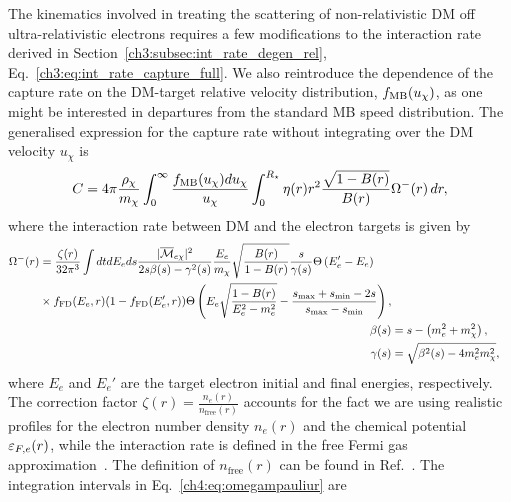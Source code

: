 The kinematics involved in treating the scattering of non-relativistic DM off ultra-relativistic electrons requires a few modifications to the interaction rate derived in Section~\ref{ch3:subsec:int_rate_degen_rel}, Eq.~\ref{ch3:eq:int_rate_capture_full}.
We also reintroduce the dependence of the capture rate on the DM-target relative velocity distribution, $f_{\rm MB}(u_\chi)$, as one might be interested in departures from the standard MB speed distribution. The generalised expression for the capture rate without integrating over the DM velocity $u_\chi$ is 
\begin{equation}
C = 4\pi \frac{\rho_\chi}{m_\chi} \int_0^\infty \frac{f_{\rm MB}(u_\chi)du_\chi}{u_\chi}
\int_0^{R_\star} \eta(r) r^2 \frac{\sqrt{1-B(r)}}{B(r)} \Omega^{-}(r)  \, dr,     \label{ch4:eq:capturelec}
\end{equation}
where the interaction rate between DM and the electron targets is given by~\cite{Bell:2020jou_sep_ImprovedTreatmentDark,Bell:2020lmm_mar_ImprovedTreatmentDark} 
\small
\begin{align}
    \begin{split}
        \Omega^{-}(r) &= \frac{\zeta(r)}{32\pi^3}\int dt dE_e ds  
        \frac{|\overline{\mathcal{M}}_{e\chi}|^2}{2s\beta(s)-\gamma^2(s)}  \frac{E_e}{m_\chi}\sqrt{\frac{B(r)}{1-B(r)}} \frac{s}{\gamma(s)}\Theta\left(E_e'-E_e\right)\\
        &\times f_{\rm FD}(E_e,r)(1-f_{\rm FD}(E_e',r))\Theta\left(E_e\sqrt{\frac{1-B(r)}{E_e^2-m_e^2}}-\frac{s_\mathrm{max}+s_\mathrm{min}-2s}{s_\mathrm{max}-s_\mathrm{min}}\right),
        \label{ch4:eq:omegampauliur}
    \end{split}\\
        \beta(s) &= s-\left(m_e^2+m_\chi^2\right),\\
        \gamma(s) &= \sqrt{\beta^2(s)-4m_e^2m_\chi^2},
\end{align}
\normalsize
where $E_e$ and $E_e'$ are the target electron initial and final energies, respectively. The correction factor $\zeta(r)=\frac{n_{e}(r)}{n_\mathrm{free}(r)}$ accounts for the fact we are using realistic profiles for the electron number density $n_e(r)$ and the chemical potential $\varepsilon_{F,e}(r)$, while the interaction rate is defined in the free Fermi gas approximation~\cite{Garani:2018kkd_may_NewAnalysisNeutron,Bell:2020jou_sep_ImprovedTreatmentDark,Bell:2020obw_sep_NucleonStructureStrong}. 
The definition of $n_\mathrm{free}(r)$ can be found in Ref.~\cite{Bell:2020jou_sep_ImprovedTreatmentDark}. 
The integration intervals in Eq.~\ref{ch4:eq:omegampauliur} are
